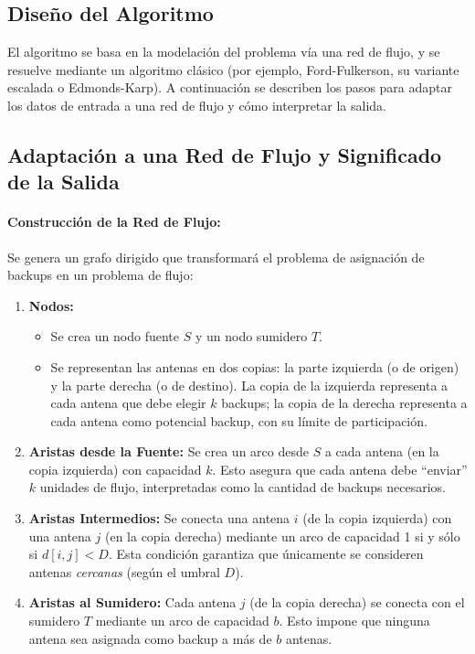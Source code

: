 \documentclass[a4paper, 12pt]{article}
\begin{document}
    \subsection{Diseño del Algoritmo}
El algoritmo se basa en la modelación del problema vía una red de flujo, y se resuelve mediante un algoritmo clásico (por ejemplo, Ford-Fulkerson, su variante escalada o Edmonds-Karp). A continuación se describen los pasos para adaptar los datos de entrada a una red de flujo y cómo interpretar la salida.

\subsection{Adaptación a una Red de Flujo y Significado de la Salida}
\paragraph{Construcción de la Red de Flujo:}
Se genera un grafo dirigido que transformará el problema de asignación de backups en un problema de flujo:
\begin{enumerate}[label=\alph*.]
    \item \textbf{Nodos:}
    \begin{itemize}
        \item Se crea un nodo fuente \(S\) y un nodo sumidero \(T\).
        \item Se representan las antenas en dos copias: la parte izquierda (o de origen) y la parte derecha (o de destino). La copia de la izquierda representa a cada antena que debe elegir \(k\) backups; la copia de la derecha representa a cada antena como potencial backup, con su límite de participación.
    \end{itemize}
    \item \textbf{Aristas desde la Fuente:}  
    Se crea un arco desde \(S\) a cada antena (en la copia izquierda) con capacidad \(k\). Esto asegura que cada antena debe “enviar” \(k\) unidades de flujo, interpretadas como la cantidad de backups necesarios.
    
    \item \textbf{Aristas Intermedios:}  
    Se conecta una antena \(i\) (de la copia izquierda) con una antena \(j\) (en la copia derecha) mediante un arco de capacidad 1 si y sólo si \(d[i,j] < D\). Esta condición garantiza que únicamente se consideren antenas \emph{cercanas} (según el umbral \(D\)).
    
    \item \textbf{Aristas al Sumidero:}  
    Cada antena \(j\) (de la copia derecha) se conecta con el sumidero \(T\) mediante un arco de capacidad \(b\). Esto impone que ninguna antena sea asignada como backup a más de \(b\) antenas.
\end{enumerate}
\end{document}
